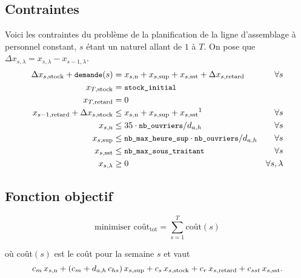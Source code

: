 \subsection*{Contraintes}
Voici les contraintes du problème de la planification 
de la ligne d’assemblage à personnel constant, $s$ étant un naturel allant de $1$ à $T$.
On pose que $\Delta x_{s,\lambda} = x_{s,\lambda} - x_{s-1,\lambda}$.
\begin{align*}
  \Delta\xstock + \texttts{demande}(s) &= \xn + \xsup
   + \xsst + \Delta\xretard &\forall s \\
  \myX{T}{stock} &= \texttts{stock\_initial} \\
  \myX{T}{retard}&= 0 \\
  \myX{s-1}{retard} + \Delta\xstock &\leq \xn + \xsup + \xsst \text{\footnotemark} &\forall s \\
  \xn &\leq 35\cdot \texttts{nb\_ouvriers}/ d_{a,h}
  &\forall s \\
  \xsup &\leq \texttts{nb\_max\_heure\_sup}\cdot\texttts{nb\_ouvriers}/ d_{a,h}
  &\forall s \\
  \xsst &\leq \texttts{nb\_max\_sous\_traitant} &\forall s \\
  x_{s,\lambda} &\geq 0 &\forall s,\lambda \\
\end{align*}

\subsection*{Fonction objectif}
\[ \text{minimiser } \text{coût}_\text{tot} = \sum_{s=1}^{T} \text{coût}(s) \]

où coût$(s)$ est le coût pour la semaine $s$ et vaut
\[
  c_m\, x_{s,\text{n}} + (c_m + d_{a,h} \, c_{hs})\, x_{s,\text{sup}}
  + c_s\, x_{s,\text{stock}} + c_r\, x_{s,\text{retard}} + c_{sst}\, x_{s,\text{sst}}.
\]

